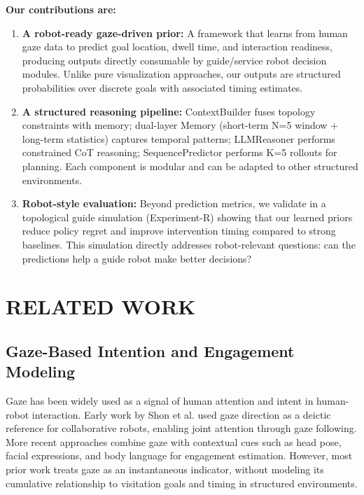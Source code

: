 \documentclass[letterpaper]{article}
\begin{document}
\textbf{Our contributions are:}

\begin{enumerate}
    \item \textbf{A robot-ready gaze-driven prior:} A framework that learns from human gaze data to predict goal location, dwell time, and interaction readiness, producing outputs directly consumable by guide/service robot decision modules. Unlike pure visualization approaches, our outputs are structured probabilities over discrete goals with associated timing estimates.

    \item \textbf{A structured reasoning pipeline:} ContextBuilder fuses topology constraints with memory; dual-layer Memory (short-term N=5 window + long-term statistics) captures temporal patterns; LLMReasoner performs constrained CoT reasoning; SequencePredictor performs K=5 rollouts for planning. Each component is modular and can be adapted to other structured environments.

    \item \textbf{Robot-style evaluation:} Beyond prediction metrics, we validate in a topological guide simulation (Experiment-R) showing that our learned priors reduce policy regret and improve intervention timing compared to strong baselines. This simulation directly addresses robot-relevant questions: can the predictions help a guide robot make better decisions?
\end{enumerate}

\section{RELATED WORK}

\subsection{Gaze-Based Intention and Engagement Modeling}

Gaze has been widely used as a signal of human attention and intent in human-robot interaction. Early work by Shon et al. used gaze direction as a deictic reference for collaborative robots, enabling joint attention through gaze following. More recent approaches combine gaze with contextual cues such as head pose, facial expressions, and body language for engagement estimation. However, most prior work treats gaze as an instantaneous indicator, without modeling its cumulative relationship to visitation goals and timing in structured environments.
\end{document}
